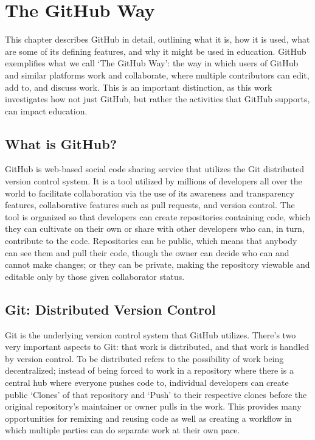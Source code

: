\chapter{The GitHub Way}
This chapter describes GitHub in detail, outlining what it is, how it is used, what are some of its defining features, and why it might be used in education. GitHub exemplifies what we call `The GitHub Way': the way in which users of GitHub and similar platforms work and collaborate, where multiple contributors can edit, add to, and discuss work. This is an important distinction, as this work investigates how not just GitHub, but rather the activities that GitHub supports, can impact education. %

\section{What is GitHub?}
GitHub is web-based social code sharing service that utilizes the Git distributed version control system. It is a tool utilized by millions of developers all over the world to facilitate collaboration via the use of its awareness and transparency features, collaborative features such as pull requests, and version control. The tool is organized so that developers can create repositories containing code, which they can cultivate on their own or share with other developers who can, in turn, contribute to the code. Repositories can be public, which means that anybody can see them and pull their code, though the owner can decide who can and cannot make changes; or they can be private, making the repository viewable and editable only by those given collaborator status.

\section{Git: Distributed Version Control}
Git is the underlying version control system that GitHub utilizes. There's two very important aspects to Git: that work is distributed, and that work is handled by version control. To be distributed refers to the possibility of work being decentralized; instead of being forced to work in a repository where there is a central hub where everyone pushes code to, individual developers can create public `Clones' of that repository and `Push' to their respective clones before the original repository's maintainer or owner pulls in the work. This provides many opportunities for remixing and reusing code as well as creating a workflow in which multiple parties can do separate work at their own pace.


